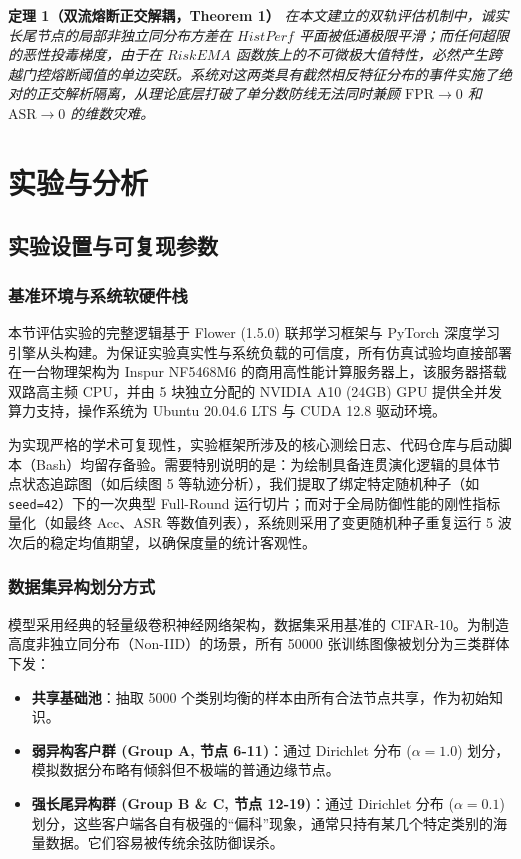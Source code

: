 \documentclass[11pt, a4paper, UTF8, fontset=fandol]{ctexart}
\begin{document}
\textbf{定理 1（双流熔断正交解耦，Theorem 1）}
\textit{在本文建立的双轨评估机制中，诚实长尾节点的局部非独立同分布方差在 $HistPerf$ 平面被低通极限平滑；而任何超限的恶性投毒梯度，由于在 $RiskEMA$ 函数族上的不可微极大值特性，必然产生跨越门控熔断阈值的单边突跃。系统对这两类具有截然相反特征分布的事件实施了绝对的正交解析隔离，从理论底层打破了单分数防线无法同时兼顾 $\text{FPR} \to 0$ 和 $\text{ASR} \to 0$ 的维数灾难。}

\section{实验与分析}
\label{sec:experiments}
\subsection{实验设置与可复现参数}

\subsubsection{基准环境与系统软硬件栈}
本节评估实验的完整逻辑基于 Flower (1.5.0) 联邦学习框架与 PyTorch 深度学习引擎从头构建。为保证实验真实性与系统负载的可信度，所有仿真试验均直接部署在一台物理架构为 Inspur NF5468M6 的商用高性能计算服务器上，该服务器搭载双路高主频 CPU，并由 5 块独立分配的 NVIDIA A10 (24GB) GPU 提供全并发算力支持，操作系统为 Ubuntu 20.04.6 LTS 与 CUDA 12.8 驱动环境。

为实现严格的学术可复现性，实验框架所涉及的核心测绘日志、代码仓库与启动脚本（Bash）均留存备验。需要特别说明的是：为绘制具备连贯演化逻辑的具体节点状态追踪图（如后续图 5 等轨迹分析），我们提取了绑定特定随机种子（如 \texttt{seed=42}）下的一次典型 Full-Round 运行切片；而对于全局防御性能的刚性指标量化（如最终 Acc、ASR 等数值列表），系统则采用了变更随机种子重复运行 5 波次后的稳定均值期望，以确保度量的统计客观性。

\subsubsection{数据集异构划分方式}
模型采用经典的轻量级卷积神经网络架构，数据集采用基准的 CIFAR-10。为制造高度非独立同分布（Non-IID）的场景，所有 50000 张训练图像被划分为三类群体下发：
\begin{itemize}
    \item \textbf{共享基础池}：抽取 5000 个类别均衡的样本由所有合法节点共享，作为初始知识。
    \item \textbf{弱异构客户群 (Group A, 节点 6-11)}：通过 Dirichlet 分布 ($\alpha=1.0$) 划分，模拟数据分布略有倾斜但不极端的普通边缘节点。
    \item \textbf{强长尾异构群 (Group B \& C, 节点 12-19)}：通过 Dirichlet 分布 ($\alpha=0.1$) 划分，这些客户端各自有极强的“偏科”现象，通常只持有某几个特定类别的海量数据。它们容易被传统余弦防御误杀。
\end{itemize}
\end{document}
